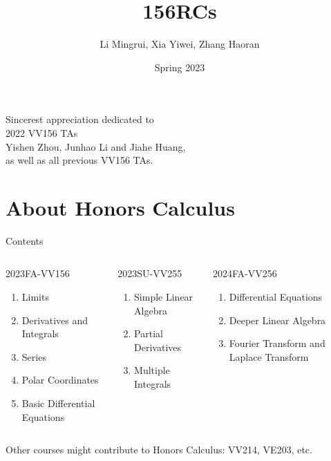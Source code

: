 \documentclass{beamer}
\title{\LARGE 156RCs}
\author{ Li Mingrui, Xia Yiwei, Zhang Haoran}
\date{Spring 2023}
\begin{document}
\maketitle
\begin{frame}
\begin{center}
\Large
    Sincerest appreciation dedicated to \\
    2022 VV156 TAs\\
    Yishen Zhou, Junhao Li and  Jiahe Huang, \\
    as well as all previous VV156 TAs.
    \normalsize
\end{center}
    
\end{frame}


\section{About Honors Calculus}
\begin{frame}{Contents}
    	
\begin{columns}

\begin{column}{.333\linewidth}
\Large 2023FA-VV156
\normalsize
\begin{enumerate}
	\item Limits
	\item Derivatives and Integrals
	\item Series
	\item Polar Coordinates
	\item Basic Differential Equations
\end{enumerate}
\end{column}

\begin{column}{.333\linewidth}
\Large 2023SU-VV255
\normalsize
\begin{enumerate}
	\item Simple Linear Algebra
	\item Partial Derivatives
	\item Multiple Integrals
\end{enumerate}
\end{column}

\begin{column}{.333\linewidth}
\Large 2024FA-VV256
\normalsize
\begin{enumerate}
	\item Differential Equations
	\item Deeper Linear Algebra
	\item Fourier Transform and Laplace Transform

\end{enumerate}
\end{column}

\end{columns}
\vspace {1cm}
Other courses might contribute to Honors Calculus:
VV214, VE203, etc.
	
\end{frame}
\end{document}
